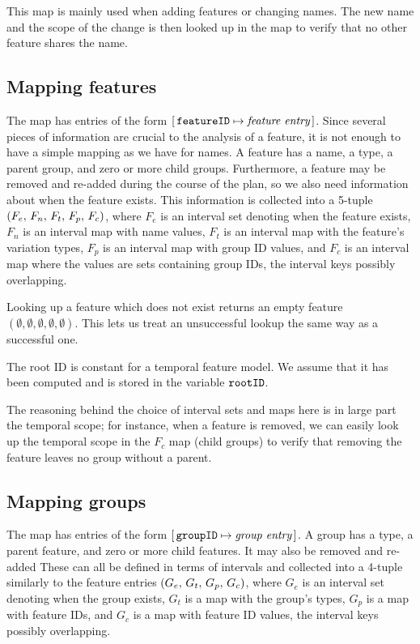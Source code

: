 This map is mainly used when adding features or changing names. The new name and the scope of the change is then looked up in the \names{} map to verify that no other feature shares the name.

\subsection{Mapping features}
\label{sub:mapping-features}

The \features{} map has entries of the form $[ \,\texttt{featureID} \mapsto \textit{feature entry}\, ]$. Since several pieces of information are crucial to the analysis of a feature, it is not enough to have a simple mapping as we have for names.
A feature has a name, a type, a parent group, and zero or more child groups. Furthermore, a feature may be removed and re-added during the course of the plan, so we also need information about when the feature exists.
This information is collected into a 5-tuple $\left(F_e,\, F_n,\, F_t,\, F_p,\, F_c\right)$, where $F_e$ is an interval set denoting when the feature exists, $F_n$ is an interval map with name values, $F_t$ is an interval map with the feature's variation types, $F_p$ is an interval map with group ID values, and $F_c$ is an interval map where the values are sets containing group IDs, the interval keys possibly overlapping.

Looking up a feature which does not exist returns an empty feature $(\emptyset \comma \emptyset \comma \emptyset \comma \emptyset \comma \emptyset)$. This lets us treat an unsuccessful lookup the same way as a successful one.

The root ID is constant for a temporal feature model. We assume that it has been computed and is stored in the variable $\texttt{rootID}$. 

The reasoning behind the choice of interval sets and maps here is in large part the temporal scope; for instance, when a feature is removed, we can easily look up the temporal scope in the $F_c$ map (child groups) to verify that removing the feature leaves no group without a parent.

\subsection{Mapping groups}
\label{sub:mapping-groups}

The \groups{} map has entries of the form $[ \,\texttt{groupID} \mapsto \textit{group entry}\, ]$. A group has a type, a parent feature, and zero or more child features. It may also be removed and re-added These can all be defined in terms of intervals and collected into a 4-tuple similarly to the feature entries $\left(G_e,\, G_t,\, G_p,\, G_c\right)$, where $G_e$ is an interval set denoting when the group exists, $G_t$ is a map with the group's types, $G_p$ is a map with feature IDs, and $G_c$ is a map with feature ID values, the interval keys possibly overlapping.

